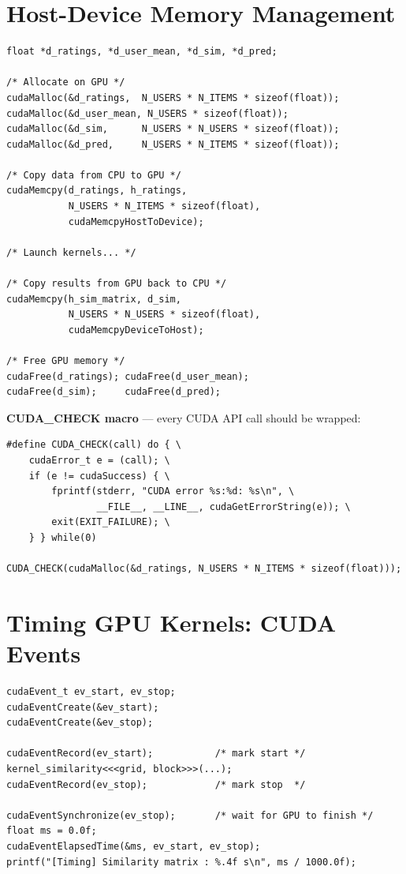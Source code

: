 \documentclass[12pt,a4paper]{article}
\begin{document}
\section{Host-Device Memory Management}

\begin{lstlisting}
float *d_ratings, *d_user_mean, *d_sim, *d_pred;

/* Allocate on GPU */
cudaMalloc(&d_ratings,  N_USERS * N_ITEMS * sizeof(float));
cudaMalloc(&d_user_mean, N_USERS * sizeof(float));
cudaMalloc(&d_sim,      N_USERS * N_USERS * sizeof(float));
cudaMalloc(&d_pred,     N_USERS * N_ITEMS * sizeof(float));

/* Copy data from CPU to GPU */
cudaMemcpy(d_ratings, h_ratings,
           N_USERS * N_ITEMS * sizeof(float),
           cudaMemcpyHostToDevice);

/* Launch kernels... */

/* Copy results from GPU back to CPU */
cudaMemcpy(h_sim_matrix, d_sim,
           N_USERS * N_USERS * sizeof(float),
           cudaMemcpyDeviceToHost);

/* Free GPU memory */
cudaFree(d_ratings); cudaFree(d_user_mean);
cudaFree(d_sim);     cudaFree(d_pred);
\end{lstlisting}

\textbf{CUDA\_CHECK macro} — every CUDA API call should be wrapped:
\begin{lstlisting}
#define CUDA_CHECK(call) do { \
    cudaError_t e = (call); \
    if (e != cudaSuccess) { \
        fprintf(stderr, "CUDA error %s:%d: %s\n", \
                __FILE__, __LINE__, cudaGetErrorString(e)); \
        exit(EXIT_FAILURE); \
    } } while(0)

CUDA_CHECK(cudaMalloc(&d_ratings, N_USERS * N_ITEMS * sizeof(float)));
\end{lstlisting}

\section{Timing GPU Kernels: CUDA Events}

\begin{lstlisting}
cudaEvent_t ev_start, ev_stop;
cudaEventCreate(&ev_start);
cudaEventCreate(&ev_stop);

cudaEventRecord(ev_start);           /* mark start */
kernel_similarity<<<grid, block>>>(...);
cudaEventRecord(ev_stop);            /* mark stop  */

cudaEventSynchronize(ev_stop);       /* wait for GPU to finish */
float ms = 0.0f;
cudaEventElapsedTime(&ms, ev_start, ev_stop);
printf("[Timing] Similarity matrix : %.4f s\n", ms / 1000.0f);
\end{lstlisting}
\end{document}
